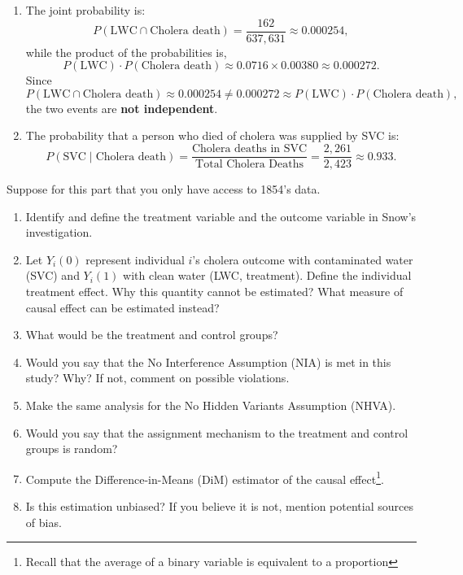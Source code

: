 \documentclass[11pt]{exam}
\begin{document}
\begin{questions}
\begin{solution}[0cm]
\begin{enumerate}[label=(\alph*)]
        \item The joint probability is:
        \[
        P(\text{LWC} \cap \text{Cholera death}) = \frac{162}{637{,}631} \approx 0.000254,
        \]
        while the product of the probabilities is,
        \[
        P(\text{LWC}) \cdot P(\text{Cholera death}) \approx 0.0716 \times 0.00380 \approx 0.000272.
        \]
        Since 
        $$
        P(\text{LWC} \cap \text{Cholera death}) \approx 0.000254 \neq 0.000272 \approx P(\text{LWC}) \cdot P(\text{Cholera death}),
        $$
        the two events are \textbf{not independent}.
        
        \item The probability that a person who died of cholera was supplied by SVC is:
        \[
        P(\text{SVC} \mid \text{Cholera death}) = \frac{\text{Cholera deaths in SVC}}{\text{Total Cholera Deaths}} = \frac{2{,}261}{2{,}423} \approx \boxed{0.933}.
        \]
    \end{enumerate}

\end{solution}

\question[4]
Suppose for this part that you only have access to 1854's data.
\begin{enumerate}[label=(\alph*)]
    \item Identify and define the treatment variable and the outcome variable in Snow’s investigation.
    \item Let \(Y_i(0)\) represent individual \(i\)'s cholera outcome with contaminated water (SVC) and \(Y_i(1)\) with clean water (LWC, treatment). Define the individual treatment effect. Why this quantity cannot be estimated? What measure of causal effect can be estimated instead?
    \item What would be the treatment and control groups?
    \item Would you say that the No Interference Assumption (NIA) is met in this study? Why? If not, comment on possible violations.
    \item Make the same analysis for the No Hidden Variants Assumption (NHVA).
    \item Would you say that the assignment mechanism to the treatment and control groups is random?
    \item Compute the Difference-in-Means (DiM) estimator of the causal effect\footnote{Recall that the average of a binary variable is equivalent to a proportion}.
    \item Is this estimation unbiased? If you believe it is not, mention potential sources of bias.
\end{enumerate}


\end{questions}
\end{document}
